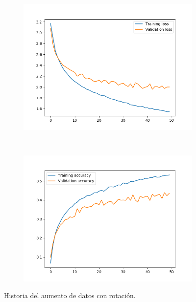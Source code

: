 \documentclass[11pt,a4paper]{article}
\begin{document}
\begin{figure}[H]
  \begin{subfigure}{.5\textwidth}
    \includegraphics[scale=0.4]{img/aug-rot-loss.png}
    \label{fig:aug-rot-loss}
  \end{subfigure}%
  ~ \quad
  \begin{subfigure}{.5\textwidth}
    \includegraphics[scale=0.4]{img/aug-rot-acc.png}
    \label{fig:aug-rot-acc}
  \end{subfigure}
  \caption{Historia del aumento de datos con rotación.}
  \label{fig:history-aug-rot}
\end{figure}
\end{document}
